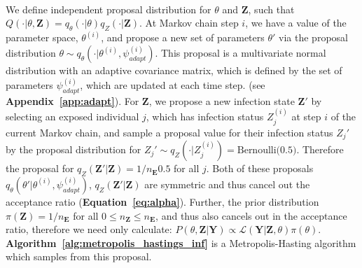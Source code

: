 \paragraph{}We define independent proposal distribution for $\theta$ and $\mathbf{Z}$,  such that $Q(\cdot | \theta, \mathbf{Z}) = q_\theta(\cdot |\theta)q_Z(\cdot |\mathbf{Z})$. At Markov chain step $i$, we have a value of the parameter space, $\theta^{(i)}$, and propose a new set of parameters $\theta'$ via the proposal distribution $\theta \sim q_\theta(\cdot | \theta^{(i)}, \psi^{(i)}_{adapt})$. This proposal is a multivariate normal distribution with an adaptive covariance matrix, which is defined by the set of parameters $\psi^{(i)}_{adapt}$, which are updated at each time step.\cite{Roberts2012-ju, Andrieu2008-yx} (see \textbf{Appendix~\ref{app:adapt}}). For $\mathbf{Z}$, we propose a new infection state $\mathbf{Z}'$ by selecting an exposed individual $j$, which has infection status $Z_j^{(i)}$ at step $i$ of the current Markov chain, and sample a proposal value for their infection status $Z_j'$ by the proposal distribution for $Z_j' \sim q_Z(\cdot | Z^{(i)}_j)= \text{Bernoulli(0.5)}$. Therefore the proposal for $q_Z(\mathbf{Z}'|\mathbf{Z}) = 1/n_\mathbf{E}0.5$ for all $j$. Both of these proposals $q_\theta\left(\theta' | \theta^{(i)}, \psi^{(i)}_{adapt}\right)$, $q_Z(\mathbf{Z}'|\mathbf{Z})$ are symmetric and thus cancel out the acceptance ratio (\textbf{Equation~\ref{eq:alpha}}). Further, the prior distribution $\pi(\mathbf{Z}) = 1 / n_\mathbf{E}$ for all $0 \leq n_\mathbf{Z} \leq n_\mathbf{E}$, and thus also cancels out in the acceptance ratio, therefore we need only calculate: $P(\theta, \mathbf{Z} | \mathbf{Y}) \propto \mathcal{L}(\mathbf{Y} | \mathbf{Z}, \theta)\pi(\theta)$. \textbf{Algorithm~\ref{alg:metropolis_hastings_inf}} is a Metropolis-Hasting algorithm which samples from this proposal.

